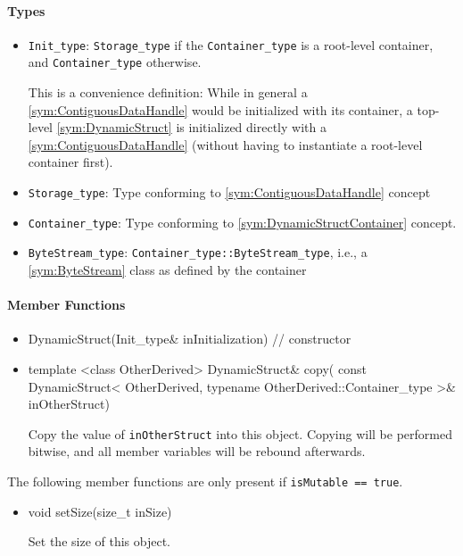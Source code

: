 \paragraph{Types}

\begin{itemize}
	\item \texttt{Init\_type}: \texttt{Storage\_type} if the \texttt{Container\_type} is a root-level container, and \texttt{Container\_type} otherwise.

	This is a convenience definition: While in general a \ref{sym:ContiguousDataHandle} would be initialized with its container, a top-level \ref{sym:DynamicStruct} is initialized directly with a \ref{sym:ContiguousDataHandle} (without having to instantiate a root-level container first).

	\item \texttt{Storage\_type}: Type conforming to \ref{sym:ContiguousDataHandle} concept
	\item \texttt{Container\_type}: Type conforming to \ref{sym:DynamicStructContainer} concept.
	\item \texttt{ByteStream\_type}: \texttt{Container\_type::ByteStream\_type}, i.e., a \ref{sym:ByteStream} class as defined by the container
\end{itemize}

\paragraph{Member Functions}

\begin{itemize}
	\item
		\begin{cppsnippet}
		DynamicStruct(Init_type& inInitialization) // constructor
		\end{cppsnippet}

	\item
		\begin{cppsnippet}
		template <class OtherDerived>
		DynamicStruct& copy(
		    const DynamicStruct<
		        OtherDerived,
		        typename OtherDerived::Container_type
		    >& inOtherStruct)
		\end{cppsnippet}

		Copy the value of \texttt{inOtherStruct} into this object. Copying will be performed bitwise, and all member variables will be rebound afterwards.
\end{itemize}

The following member functions are only present if \texttt{isMutable == true}.
\begin{itemize}
	\item
		\begin{cppsnippet}
		void setSize(size_t inSize)
		\end{cppsnippet}

		Set the size of this object.
\end{itemize}

